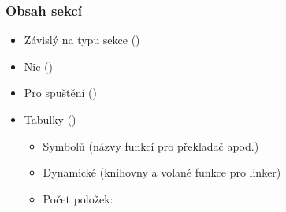 

\begin{frame}
  \frametitle{Obsah sekcí}

  \begin{itemize}
    \item Závislý na typu sekce ()

    \pause

    \item Nic ()
    \item Pro spuštění ()

    \pause

    \item Tabulky ()
    \begin{itemize}
      \item Symbolů (názvy funkcí pro překladač apod.)
      \item Dynamické (knihovny a volané funkce pro linker)

      \pause

      \item Počet položek: 
    \end{itemize}
  \end{itemize}

\end{frame}

